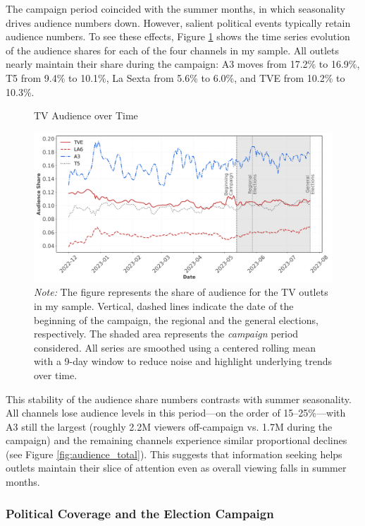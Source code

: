 \documentclass[12pt]{article}
\begin{document}
	
The campaign period coincided with the summer months, in which seasonality drives audience numbers down. However, salient political events typically retain audience numbers. To see these effects, 	Figure \ref{fig:audience_share} shows the time series evolution of the audience shares for each of the four channels in my sample. All outlets nearly maintain their share during the campaign: A3 moves from 17.2\% to 16.9\%, T5 from 9.4\% to 10.1\%, La Sexta from 5.6\% to 6.0\%, and TVE from 10.2\% to 10.3\%. 
	
	
		\begin{figure}[!htbp]
		\caption{TV Audience over Time}
		\centering
		\includegraphics[width=150mm]{figures/tv_audience_sharev2}
		\caption*{\small \textit{Note:} The figure represents the share of audience for the TV outlets in my sample.  Vertical, dashed lines indicate the date of the beginning of the campaign, the regional and the general elections, respectively. The shaded area represents the \textit{campaign} period considered.  All series are smoothed using a centered rolling mean with a 9-day window to reduce noise and highlight underlying trends over time.}
		\label{fig:audience_share}
	\end{figure}
	
	

This stability of the audience share numbers contrasts with summer seasonality. All channels lose audience levels in this period—on the order of 15–25\%—with A3 still the largest (roughly 2.2M viewers off-campaign vs. 1.7M during the campaign) and the remaining channels experience similar proportional declines (see Figure  \ref{fig:audience_total}). This  suggests that information seeking  helps outlets maintain their slice of attention even as overall viewing falls in summer months. 


	
		\subsubsection*{Political Coverage and the Election Campaign}
		
\end{document}
